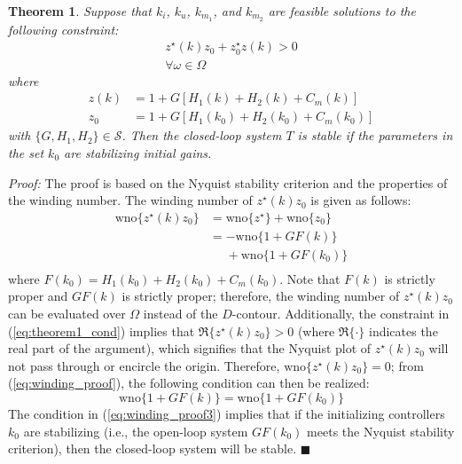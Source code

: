 \documentclass[a4paper, 10pt, conference]{ieeeconf}
\newtheorem{theorem}{Theorem}
\begin{document}
\begin{theorem} \label{Thm1}
Suppose that $k_i$, $k_u$, $k_{m_1}$, and $k_{m_2}$ are feasible solutions to the following constraint:
\begin{equation} \label{eq:theorem1_cond}
\begin{split}
z^{\star}(k)z_0+z_0^{\star}z(k) > 0 \\
\forall \omega \in \Omega
\end{split}
\end{equation}
where 
\begin{align*}
z(k) &= 1+G[H_1(k)+H_2(k)+C_m(k)] \\
z_0 &= 1+G[H_1(k_0)+H_2(k_0)+C_m(k_0)]
\end{align*}
with $\{G,H_1,H_2\} \in \mathscr{S}$. Then the closed-loop system $T$ is stable if the parameters in the set $k_0$ are stabilizing initial gains.
\end{theorem}

\textit{Proof:}
The proof is based on the Nyquist stability criterion and the properties of the winding number. The winding number of $z^{\star}(k)z_0$ is given as follows:
\begin{equation} \label{eq:winding_proof}
\begin{aligned}
{\mbox{wno}} \{ z^{\star}(k)z_0\} &= {\mbox{wno}} \{ z^{\star}\} + {\mbox{wno}} \{ z_0\} \\
&= -{\mbox{wno}} \{ 1+GF(k)\} \\
&\phantom{=} + {\mbox{wno}} \{ 1+GF(k_0)\} \\
\end{aligned}
\end{equation}
where $F(k_0) = H_1(k_0) + H_2(k_0) + C_m(k_0)$. Note that $F(k)$ is strictly proper and $GF(k)$ is strictly proper; therefore, the winding number of $z^{\star}(k)z_0$ can be evaluated over $\Omega$ instead of the $D$-contour. Additionally, the constraint in (\ref{eq:theorem1_cond}) implies that $\Re\{ z^{\star}(k)z_0\} > 0$ (where $\Re\{ \cdot \}$ indicates the real part of the argument), which signifies that the Nyquist plot of $z^{\star}(k)z_0$ will not pass through or encircle the origin. Therefore, $\mbox{wno} \{ z^{\star}(k)z_0\} = 0$; from (\ref{eq:winding_proof}), the following condition can then be realized:
\begin{equation} \label{eq:winding_proof3}
\mbox{wno} \{ 1+GF(k)\} = {\mbox{wno}} \{ 1+GF(k_0)\}
\end{equation}
The condition in (\ref{eq:winding_proof3}) implies that if the initializing controllers $k_0$ are stabilizing (i.e., the open-loop system $GF(k_0)$ meets the Nyquist stability criterion), then the closed-loop system will be stable.
{\hfill \ensuremath{\blacksquare}}
\end{document}
